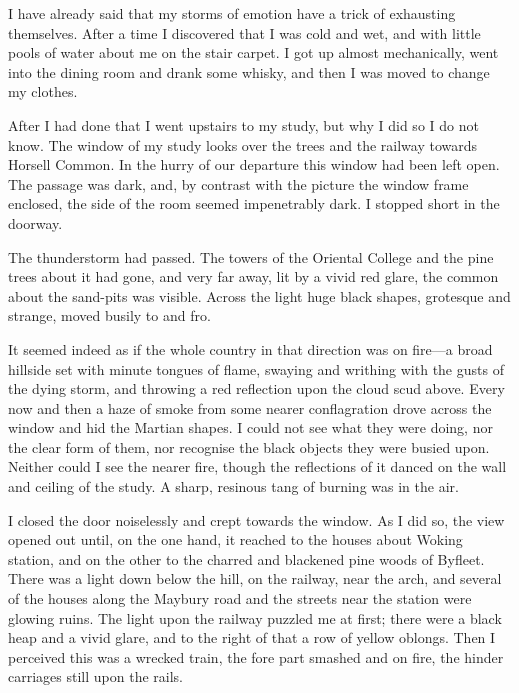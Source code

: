

\lettrine[lines=4,findent=2pt]{I}{} have already said that my storms of emotion have a trick of exhausting themselves. After a time I discovered that I was cold and wet, and with little pools of water about me on the stair carpet. I got up almost mechanically, went into the dining room and drank some whisky, and then I was moved to change my clothes.

After I had done that I went upstairs to my study, but why I did so I do not know. The window of my study looks over the trees and the railway towards Horsell Common. In the hurry of our departure this window had been left open. The passage was dark, and, by contrast with the picture the window frame enclosed, the side of the room seemed impenetrably dark. I stopped short in the doorway.

The thunderstorm had passed. The towers of the Oriental College and the pine trees about it had gone, and very far away, lit by a vivid red glare, the common about the sand-pits was visible. Across the light huge black shapes, grotesque and strange, moved busily to and fro.

It seemed indeed as if the whole country in that direction was on fire—a broad hillside set with minute tongues of flame, swaying and writhing with the gusts of the dying storm, and throwing a red reflection upon the cloud scud above. Every now and then a haze of smoke from some nearer conflagration drove across the window and hid the Martian shapes. I could not see what they were doing, nor the clear form of them, nor recognise the black objects they were busied upon. Neither could I see the nearer fire, though the reflections of it danced on the wall and ceiling of the study. A sharp, resinous tang of burning was in the air.

I closed the door noiselessly and crept towards the window. As I did so, the view opened out until, on the one hand, it reached to the houses about Woking station, and on the other to the charred and blackened pine woods of Byfleet. There was a light down below the hill, on the railway, near the arch, and several of the houses along the Maybury road and the streets near the station were glowing ruins. The light upon the railway puzzled me at first; there were a black heap and a vivid glare, and to the right of that a row of yellow oblongs. Then I perceived this was a wrecked train, the fore part smashed and on fire, the hinder carriages still upon the rails.

